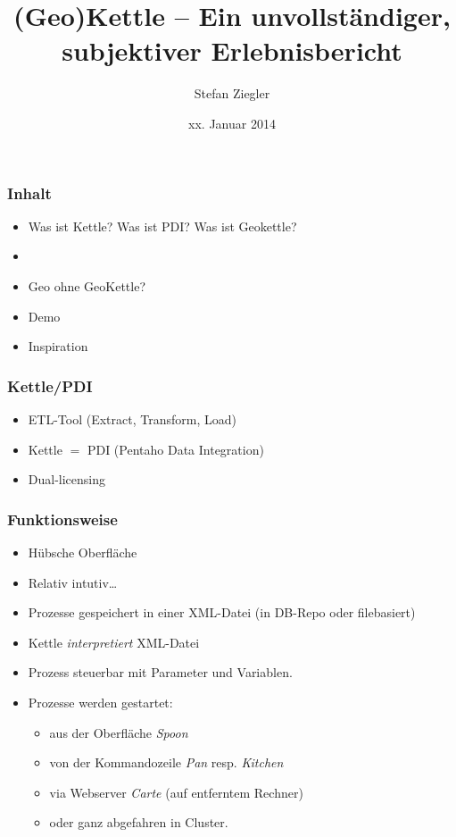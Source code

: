 \documentclass{beamer}
\title{(Geo)Kettle -- Ein unvollständiger, subjektiver Erlebnisbericht}
\author[Stefan Ziegler]%
{Stefan Ziegler}%
\institute[Amt für Geoinformation]{%
Amt für Geoinformation \\
Rötistrasse 4\\
4500 Solothurn}
\date[xx.01.13]{xx. Januar 2014}
\begin{document}
\begin{frame}
  \titlepage
\end{frame}

\begin{frame}
  \frametitle{Inhalt}
  \begin{itemize}
  \item Was ist Kettle? Was ist PDI? Was ist Geokettle?
  \item 
  \item Geo ohne GeoKettle?
  \item Demo
  \item Inspiration
  \end{itemize}
\end{frame}

\begin{frame}
  \frametitle{Kettle/PDI}
  \begin{itemize}
  \item ETL-Tool (Extract, Transform, Load)
  \item Kettle $=$ PDI (Pentaho Data Integration) 
  \item Dual-licensing
  \end{itemize}
\end{frame}

\begin{frame}
  \frametitle{Funktionsweise}
  \begin{itemize}
  \item Hübsche Oberfläche
  \item Relativ intutiv\ldots{}
  \item Prozesse gespeichert in einer XML-Datei (in DB-Repo oder filebasiert)
  \item Kettle \textsl{interpretiert} XML-Datei
  \item Prozess steuerbar mit Parameter und Variablen.
  \item Prozesse werden gestartet:
	  \begin{itemize}
	  \item aus der Oberfläche \textsl{Spoon}
	  \item von der Kommandozeile \textsl{Pan} resp. \textsl{Kitchen}
	  \item via Webserver \textsl{Carte} (auf entferntem Rechner)
	  \item oder ganz abgefahren in Cluster.
	  \end{itemize}
  \end{itemize}
\end{frame}
\end{document}

